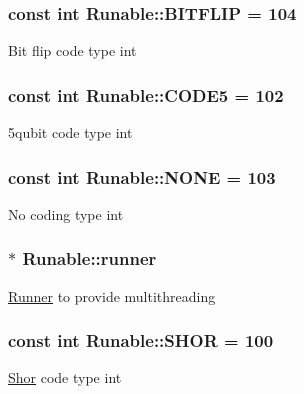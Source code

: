 \subsubsection[{\texorpdfstring{B\+I\+T\+F\+L\+IP}{BITFLIP}}]{\setlength{\rightskip}{0pt plus 5cm}const int Runable\+::\+B\+I\+T\+F\+L\+IP = 104\hspace{0.3cm}{\ttfamily [static]}}\hypertarget{class_runable_a56fc454699fbd4fcbe05bb90c36b80b0}{}\label{class_runable_a56fc454699fbd4fcbe05bb90c36b80b0}
Bit flip code type int 
\subsubsection[{\texorpdfstring{C\+O\+D\+E5}{CODE5}}]{\setlength{\rightskip}{0pt plus 5cm}const int Runable\+::\+C\+O\+D\+E5 = 102\hspace{0.3cm}{\ttfamily [static]}}\hypertarget{class_runable_ad3dbc64c086f9e02f45c8e877f5ae898}{}\label{class_runable_ad3dbc64c086f9e02f45c8e877f5ae898}
5qubit code type int 
\subsubsection[{\texorpdfstring{N\+O\+NE}{NONE}}]{\setlength{\rightskip}{0pt plus 5cm}const int Runable\+::\+N\+O\+NE = 103\hspace{0.3cm}{\ttfamily [static]}}\hypertarget{class_runable_a9dfae104f3c3623e9e39908c1560a7fe}{}\label{class_runable_a9dfae104f3c3623e9e39908c1560a7fe}
No coding type int 
\subsubsection[{\texorpdfstring{runner}{runner}}]{$\ast$ Runable\+::runner\hspace{0.3cm}{\ttfamily [protected]}}\hypertarget{class_runable_ad61073e4e8d33b564701edd7e30a967f}{}\label{class_runable_ad61073e4e8d33b564701edd7e30a967f}
\hyperlink{class_runner}{Runner} to provide multithreading 
\subsubsection[{\texorpdfstring{S\+H\+OR}{SHOR}}]{\setlength{\rightskip}{0pt plus 5cm}const int Runable\+::\+S\+H\+OR = 100\hspace{0.3cm}{\ttfamily [static]}}\hypertarget{class_runable_a27f57a3218c5237bdd5c0134db82e3f9}{}\label{class_runable_a27f57a3218c5237bdd5c0134db82e3f9}
\hyperlink{class_shor}{Shor} code type int 
